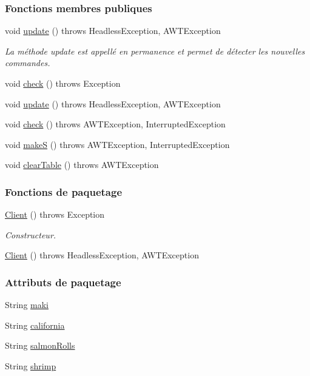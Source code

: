 \subsubsection*{Fonctions membres publiques}
\begin{DoxyCompactItemize}
\item 
void \hyperlink{classSuchi_1_1Client_a25f9c46121283d370fcfa8ecdfb32da1}{update} ()  throws Headless\+Exception, A\+W\+T\+Exception
\begin{DoxyCompactList}\small\item\em La méthode update est appellé en permanence et permet de détecter les nouvelles commandes. \end{DoxyCompactList}\item 
void \hyperlink{classSuchi_1_1Client_a533b9a4a8b34bc7915cc8c23e92d902b}{check} ()  throws Exception
\item 
void \hyperlink{classSuchi_1_1Client_a25f9c46121283d370fcfa8ecdfb32da1}{update} ()  throws Headless\+Exception, A\+W\+T\+Exception
\item 
void \hyperlink{classSuchi_1_1Client_a533b9a4a8b34bc7915cc8c23e92d902b}{check} ()  throws A\+W\+T\+Exception, Interrupted\+Exception
\item 
void \hyperlink{classSuchi_1_1Client_a9ac10e872438c578a9c9ec5f004710a5}{make\+S} ()  throws A\+W\+T\+Exception, Interrupted\+Exception
\item 
void \hyperlink{classSuchi_1_1Client_a96162d3186686e4aaebe6412d449d09f}{clear\+Table} ()  throws A\+W\+T\+Exception
\end{DoxyCompactItemize}
\subsubsection*{Fonctions de paquetage}
\begin{DoxyCompactItemize}
\item 
\hyperlink{classSuchi_1_1Client_a843ecec0eb9839c30568dab811b28485}{Client} ()  throws Exception
\begin{DoxyCompactList}\small\item\em Constructeur. \end{DoxyCompactList}\item 
\hyperlink{classSuchi_1_1Client_a843ecec0eb9839c30568dab811b28485}{Client} ()  throws Headless\+Exception, A\+W\+T\+Exception
\end{DoxyCompactItemize}
\subsubsection*{Attributs de paquetage}
\begin{DoxyCompactItemize}
\item 
String \hyperlink{classSuchi_1_1Client_ac4f46175dd37202e3e7bc24e30564766}{maki}
\item 
String \hyperlink{classSuchi_1_1Client_a2ac9fa1b6ec89770b63ffa9c23504657}{california}
\item 
String \hyperlink{classSuchi_1_1Client_a8724d79f7d9f7e2720ae6be2331475d4}{salmon\+Rolls}
\item 
String \hyperlink{classSuchi_1_1Client_af49dfab5d81b322967e58bc85aa2cd81}{shrimp}
\end{DoxyCompactItemize}
